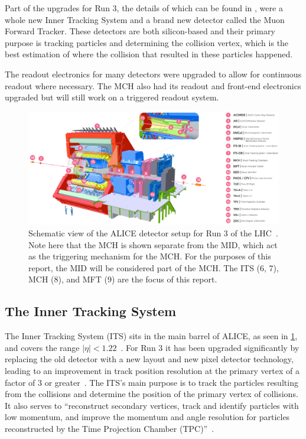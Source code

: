 Part of the upgrades for Run 3, the details of which can be found in \cite{ALICE_Upgrade_LOI}, were a whole new Inner Tracking System and a brand new detector called the Muon Forward Tracker. These detectors are both silicon-based and their primary purpose is tracking particles and determining the collision vertex, which is the best estimation of where the collision that resulted in these particles happened. 

The readout electronics for many detectors were upgraded to allow for continuous readout where necessary. The MCH also had its readout and front-end electronics upgraded but will still work on a triggered readout system.

\begin{figure}[h]
    \begin{center}
        \includegraphics[width=\textwidth]{Figs/ALICE_RUN3_schematic.png}
        \caption{Schematic view of the ALICE detector setup for Run 3 of the LHC~\cite{ALICE_schematic_labels}. Note here that the MCH is shown separate from the MID, which act as the triggering mechanism for the MCH. For the purposes of this report, the MID will be considered part of the MCH. The ITS (6, 7), MCH (8), and MFT (9) are the focus of this report.}
        \label{fig:ALICE_Schematic}
    \end{center}
\end{figure}


\subsection{The Inner Tracking System}
The Inner Tracking System (ITS) sits in the main barrel of ALICE, as seen in \cref{fig:ALICE_Schematic}, and covers the range $|\eta|<1.22$~\cite{ITS_Upgrade_TDR}. For Run 3 it has been upgraded significantly by replacing the old detector with a new layout and new pixel detector technology, leading to an improvement in track position resolution at the primary vertex of a factor of 3 or greater~\cite{ITS_Upgrade_TDR}. The ITS's main purpose is to track the particles resulting from the collisions and determine the position of the primary vertex of collisions. It also serves to ``reconstruct secondary vertices, track and identify particles with low momentum, and improve the momentum and angle resolution for particles reconstructed by the Time Projection Chamber (TPC)''~\cite{ITS_Info}.

